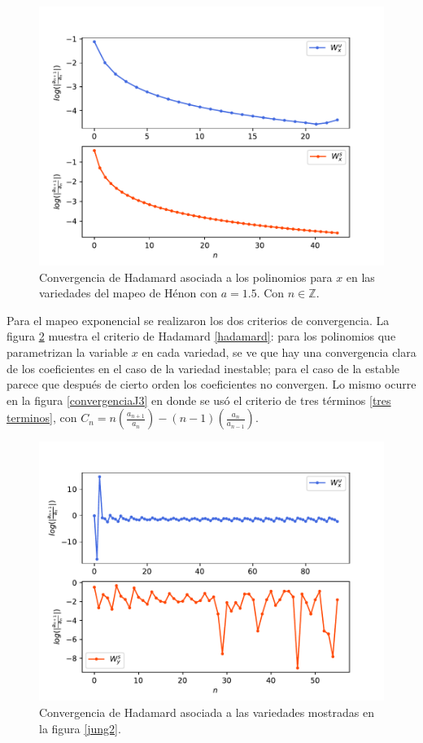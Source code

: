 \begin{figure}[H]
\centering
\includegraphics[scale=0.8]{converHenon1}
\caption{Convergencia de Hadamard asociada a los polinomios para $x$ en las variedades del mapeo de Hénon con $a=1.5$. Con $n\in\mathbb{Z}$.}
\label{convergenciaHenon1}
\end{figure}


Para el mapeo exponencial se realizaron los dos criterios de convergencia. La figura \ref{convergenciaJH} muestra el criterio de Hadamard \eqref{hadamard}: para los polinomios que parametrizan la variable $x$ en cada variedad, se ve que hay una convergencia clara de los coeficientes en el caso de la variedad inestable; para el caso de la estable parece que después de cierto orden los coeficientes no convergen. Lo mismo ocurre en la figura \ref{convergenciaJ3} en donde se usó el criterio de tres términos \eqref{tres terminos}, con $C_{n}=n\left(\frac{a_{n+1}}{a_{n}}\right)-(n-1)\left(\frac{a_{n}}{a_{n-1}}\right)$.

\begin{figure}[H]
\centering
\includegraphics[scale=0.7]{convergenciaJungH57}
\caption{Convergencia de Hadamard asociada a las variedades mostradas en la figura \ref{jung2}.}
\label{convergenciaJH}
\end{figure}



